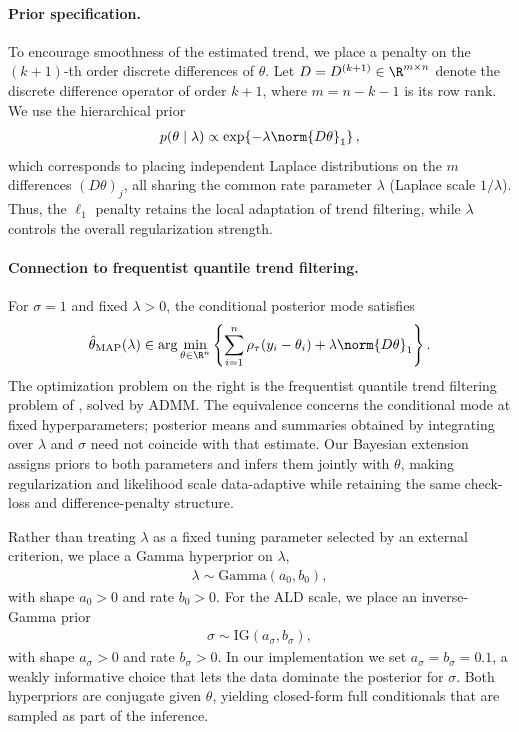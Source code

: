 \paragraph{Prior specification.}
To encourage smoothness of the estimated trend, we place a penalty on the $(k+1)$-th order discrete differences of $\theta$. Let $D = D^{(k+1)} \in \R^{m \times n}$ denote the discrete difference operator of order $k+1$, where $m = n - k - 1$ is its row rank. We use the hierarchical prior
\begin{align*}
    p(\theta \mid \lambda) \propto
    \exp\!\left\{-\lambda \norm{D\theta}_1\right\},
\end{align*}
which corresponds to placing independent Laplace distributions on the $m$ differences $(D\theta)_j$, all sharing the common rate parameter $\lambda$ (Laplace scale $1/\lambda$). Thus, the $\ell_1$ penalty retains the local adaptation of trend filtering, while $\lambda$ controls the overall regularization strength.

\paragraph{Connection to frequentist quantile trend filtering.}
For $\sigma=1$ and fixed $\lambda>0$, the conditional posterior mode satisfies
\begin{equation}
    \hat{\theta}_{\mathrm{MAP}}(\lambda)
    \in \arg\min_{\theta\in\R^n}
    \left\{\sum_{i=1}^n\rho_\tau(y_i-\theta_i)
    +\lambda\norm{D\theta}_1\right\}.
    \label{eq:map_qtf}
\end{equation}
The optimization problem on the right is the frequentist quantile trend filtering problem of \citet{brantley2020baseline}, solved by ADMM. The equivalence concerns the conditional mode at fixed hyperparameters; posterior means and summaries obtained by integrating over $\lambda$ and $\sigma$ need not coincide with that estimate. Our Bayesian extension assigns priors to both parameters and infers them jointly with $\theta$, making regularization and likelihood scale data-adaptive while retaining the same check-loss and difference-penalty structure.

Rather than treating $\lambda$ as a fixed tuning parameter selected by an external criterion, we place a Gamma hyperprior on $\lambda$,
\begin{align*}
    \lambda \sim \mathrm{Gamma}(a_0, b_0),
\end{align*}
with shape $a_0 > 0$ and rate $b_0 > 0$. For the ALD scale, we place an inverse-Gamma prior
\begin{align*}
    \sigma \sim \mathrm{IG}(a_\sigma, b_\sigma),
\end{align*}
with shape $a_\sigma > 0$ and rate $b_\sigma > 0$. In our implementation we set $a_\sigma = b_\sigma = 0.1$, a weakly informative choice that lets the data dominate the posterior for $\sigma$. Both hyperpriors are conjugate given $\theta$, yielding closed-form full conditionals that are sampled as part of the inference.

